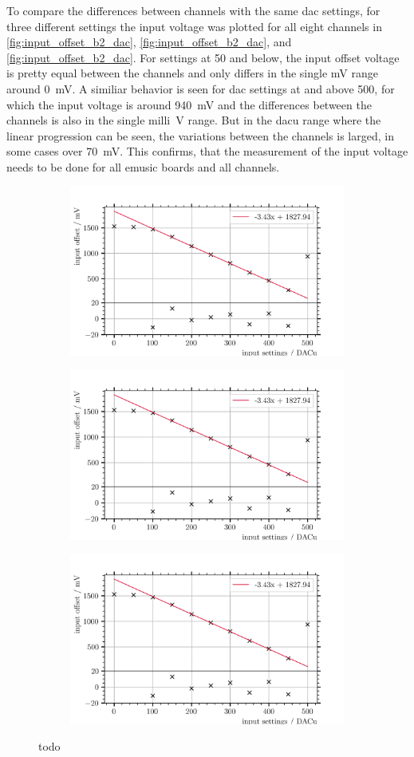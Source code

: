 To compare the differences between channels with the same \ac{dac} settings, for three different settings the input voltage was plotted for all eight channels in \autoref{fig:input_offset_b2_dac}, \autoref{fig:input_offset_b2_dac}, and \autoref{fig:input_offset_b2_dac}.
For settings at \SI{50}{\dacu} and below, the input offset voltage is pretty equal between the channels and only differs in the single \si{\milli\volt} range around \SI{0}{\milli\volt}.
A similiar behavior is seen for \ac{dac} settings at and above \SI{500}{\dacu}, for which the input voltage is around \SI{940}{\milli\volt} and the differences between the channels is also in the single \si{milli\volt} range.
But in the \si{dacu} range where the linear progression can be seen, the variations between the channels is larged, in some cases over \SI{70}{\milli\volt}.
This confirms, that the measurement of the input voltage needs to be done for all \ac{emusic} boards and all channels.
\begin{figure}
	\centering
	\begin{subfigure}[b]{1.\textwidth}
		\centering
		\includegraphics[width=.5\textwidth]{pictures/input_offset_board_2_channel_0.png}
		\caption{}
		\label{fig:input_offset_b2_dac50}
	\end{subfigure}
	
	\begin{subfigure}[b]{1.\textwidth}
		\centering
		\includegraphics[width=.5\textwidth]{pictures/input_offset_board_2_channel_0.png}
		\caption{}
		\label{fig:input_offset_b2_dac50}
	\end{subfigure}

	\begin{subfigure}[b]{1.\textwidth}
		\centering
		\includegraphics[width=.5\textwidth]{pictures/input_offset_board_2_channel_0.png}
		\caption{}
		\label{fig:input_offset_b2_dac50}
	\end{subfigure}
	\caption[todo]{todo}
	\label{fig:input_offset_b2_dac}
\end{figure}

